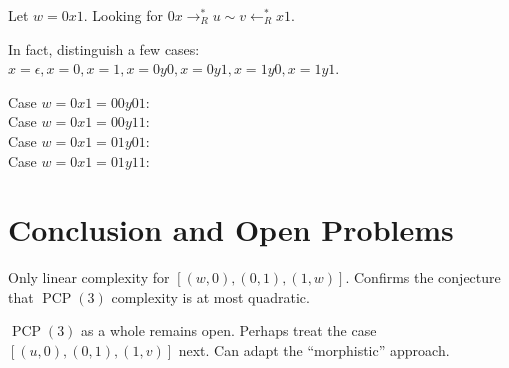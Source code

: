 \documentclass{llncs}
\newcommand{\PCP}{\operatorname{PCP}}
\newcommand{\from}{\leftarrow}
\begin{document}
Let $w = 0x1$. Looking for $0x \to_R^* u \sim v \from_R^* x1$.

In fact, distinguish a few cases:
$x = \epsilon, x=0, x=1, x=0y0, x=0y1, x=1y0, x=1y1$.


Case $w = 0x1 = 00y01$: \[  \]
Case $w=0x1=00y11$: \[  \]
Case $w=0x1=01y01$: \[  \]
Case $w = 0x1 = 01y11$: \[  \]


\section{Conclusion and Open Problems}

Only linear complexity for $[(w,0),(0,1),(1,w)]$.
Confirms the conjecture that $\PCP(3)$ complexity is at most quadratic.

$\PCP(3)$ as a whole remains open.
Perhaps treat the case $[(u,0),(0,1),(1,v)]$ next.
Can adapt the ``morphistic'' approach.
\end{document}
